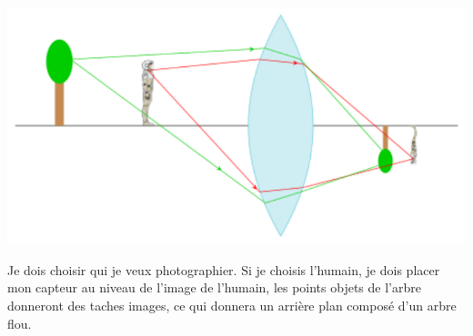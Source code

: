 \documentclass[../../main/main.tex]{subfiles}
\begin{document}
\begin{minipage}{0.53\linewidth}
	\begin{center}
		\includegraphics[width=\linewidth]{mise_pt-a}
	\end{center}
\end{minipage}
\hfill
\begin{minipage}{0.45\linewidth}
	Je dois choisir qui je veux photographier. Si je choisis l'humain, je dois
	placer mon capteur au niveau de l'image de l'humain, les points objets de
	l'arbre donneront des taches images, ce qui donnera un arrière plan composé
	d'un arbre flou.
\end{minipage}
\end{document}
